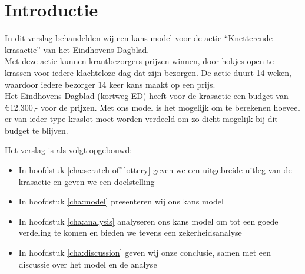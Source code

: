 \chapter{Introductie}\label{cha:introduction}
In dit verslag behandelden wij een kans model voor de actie ``Knetterende krasactie'' van het Eindhovens Dagblad. \\

Met deze actie kunnen krantbezorgers prijzen winnen, door hokjes open te krassen voor iedere klachteloze dag dat zijn bezorgen. De actie duurt 14 weken, waardoor iedere bezorger 14 keer kans maakt op een prijs.\\

Het Eindhovens Dagblad (kortweg ED) heeft voor de krasactie een budget van \euro12.300,- voor de prijzen. Met ons model is het mogelijk om te berekenen hoeveel er van ieder type kraslot moet worden verdeeld om zo dicht mogelijk bij dit budget te blijven.

Het verslag is als volgt opgebouwd:
\begin{itemize}
  \item In hoofdstuk \ref{cha:scratch-off-lottery} geven we een uitgebreide uitleg van de krasactie en geven we een doelstelling
  \item In hoofdstuk \ref{cha:model} presenteren wij ons kans model
  \item In hoofdstuk \ref{cha:analysis} analyseren ons kans model om tot een goede verdeling te komen en bieden we tevens een zekerheidsanalyse
  \item In hoofdstuk \ref{cha:discussion} geven wij onze conclusie, samen met een discussie over het model en de analyse
\end{itemize}
